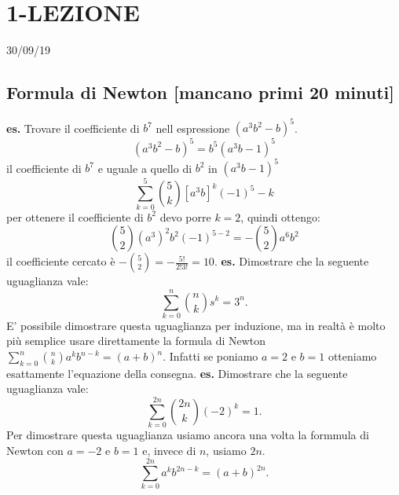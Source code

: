 \section*{1-LEZIONE}
30/09/19
\subsection*{Formula di Newton [mancano primi 20 minuti]}
\textbf{es.} Trovare il coefficiente di $b^7$ nell espressione $(a^3b^2-b)^5$.
\[
    (a^3b^2-b)^5 = b^5(a^3b-1)^5
\] 
il coefficiente di $b^7$ e uguale a quello di $b^2$ in $(a^3b-1)^5$
\[
    \sum_{k=0}^5{\binom{5}{k}[a^3b]^k(-1)^5-k}
\] 
per ottenere il coefficiente di $b^2$ devo porre $k=2$, quindi ottengo:
\[
    \binom{5}{2}(a^3)^2b^2(-1)^{5-2} = -\binom{5}{2}a^6b^2
\]
il coefficiente cercato è $-\binom{5}{2} = -\frac{5!}{2!3!} = 10$.
\newline
\newline
\textbf{es.} Dimostrare che la seguente uguaglianza vale:
\[
    \sum_{k=0}^{n}\binom{n}{k}s^k = 3^n.
\] 
E' possibile dimostrare questa uguaglianza per induzione, ma in realtà è molto più semplice usare direttamente la formula di Newton  $\sum_{k=0}^n\binom{n}{k}a^kb^{n-k}=(a+b)^n$. Infatti se poniamo $a=2$ e $b=1$ otteniamo esattamente l'equazione della consegna.
\newline
\newline
\textbf{es.} Dimostrare che la seguente uguaglianza vale:
\[
    \sum_{k=0}^{2n}\binom{2n}{k}(-2)^k=1.
\] 
Per dimostrare questa uguaglianza usiamo ancora una volta la formmula di Newton con $a=-2$ e $b=1$ e, invece di $n$, usiamo $2n$.
\[
    \sum_{k=0}^{2n} a^kb^{2n-k} = ( a+b)^{2n}.
\]

